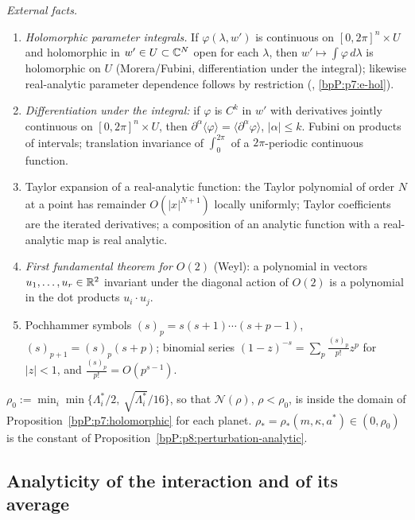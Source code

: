 \emph{External facts.}
\begin{enumerate}[label=(E\arabic*),ref=(E\arabic*)]
\item\label{bpP:p8:e-param} \emph{Holomorphic parameter integrals.} If $\varphi(\lambda,w')$ is continuous on $[0,2\pi]^n\times U$ and holomorphic in $w'\in U\subset\mathbb{C}^N$ open for each $\lambda$, then $w'\mapsto\int\varphi\,d\lambda$ is holomorphic on $U$ (Morera/Fubini, differentiation under the integral); likewise real-analytic parameter dependence follows by restriction (, \ref{bpP:p7:e-hol}).
\item\label{bpP:p8:e-diff} \emph{Differentiation under the integral:} if $\varphi$ is $C^k$ in $w'$ with derivatives jointly continuous on $[0,2\pi]^n\times U$, then $\partial^\alpha\langle\varphi\rangle=\langle\partial^\alpha\varphi\rangle$, $|\alpha|\le k$. Fubini on products of intervals; translation invariance of $\int_0^{2\pi}$ of a $2\pi$-periodic continuous function.
\item\label{bpP:p8:e-taylor} Taylor expansion of a real-analytic function: the Taylor polynomial of order $N$ at a point has remainder $O(|x|^{N+1})$ locally uniformly; Taylor coefficients are the iterated derivatives; a composition of an analytic function with a real-analytic map is real analytic.
\item\label{bpP:p8:e-weyl} \emph{First fundamental theorem for $O(2)$} (Weyl): a polynomial in vectors $u_1,\dots,u_r\in\mathbb{R}^2$ invariant under the diagonal action of $O(2)$ is a polynomial in the dot products $u_i\cdot u_j$.
\item\label{bpP:p8:e-poch} Pochhammer symbols $(s)_p=s(s+1)\cdots(s+p-1)$, $(s)_{p+1}=(s)_p(s+p)$; binomial series $(1-z)^{-s}=\sum_p\frac{(s)_p}{p!}z^p$ for $|z|<1$, and $\frac{(s)_p}{p!}=O(p^{s-1})$.
\end{enumerate}

\begin{definition}\label{bpP:p8:rho}
$\rho_0:=\min_i\min\{\Lambda_i^*/2,\ \sqrt{\Lambda_i^*}/16\}$, so that $\mathcal N(\rho)$, $\rho<\rho_0$, is inside the domain of Proposition~\ref{bpP:p7:holomorphic} for each planet. $\rho_*=\rho_*(m,\kappa,a^*)\in(0,\rho_0)$ is the constant of Proposition~\ref{bpP:p8:perturbation-analytic}.
\end{definition}

\subsection{Analyticity of the interaction and of its average}\label{bpP:p8:sec-an}

